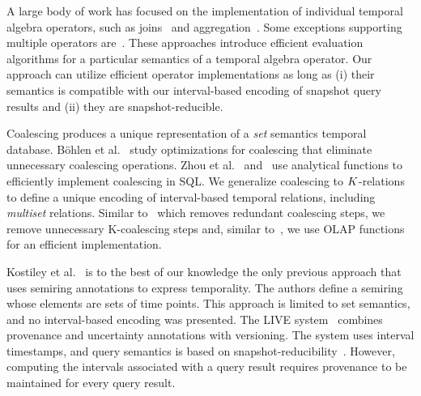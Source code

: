 %
A large body of work has focused on the implementation of individual
temporal algebra operators, such as
joins~\cite{DBLP:conf/sigmod/DignosBG14,DBLP:conf/icde/PiatovHD16,DBLP:journals/pvldb/BourosM17}
and
aggregation~\cite{DBLP:conf/edbt/BohlenGJ06,DBLP:conf/sigmod/PilmanKKKP16,DBLP:conf/ssd/PiatovH17}. Some
exceptions supporting multiple operators
are~\cite{DBLP:conf/sigmod/KaufmannMVFKFM13, DignosBGJ16,
  CafagnaB17}. These approaches introduce efficient evaluation
algorithms for a particular semantics of a temporal algebra operator.
Our approach can utilize efficient operator implementations as long as
(i) their semantics is compatible with our interval-based encoding of
snapshot query results and (ii) they are snapshot-reducible.

%
Coalescing produces a unique representation of a \emph{set} semantics
temporal database.  B\"ohlen et al.~\cite{DBLP:conf/vldb/BohlenSS96}
study optimizations for coalescing %
that eliminate unnecessary coalescing operations. Zhou et
al.~\cite{ZhouWZ06} and~\cite{DBLP:conf/dexa/Al-KatebGC12} use analytical functions to efficiently
implement coalescing in SQL.
%
We generalize coalescing to $K$-relations %
to define a unique encoding of
interval-based temporal relations, including \emph{multiset} relations. Similar
to~\cite{DBLP:conf/vldb/BohlenSS96} which removes redundant coalescing steps, we remove unnecessary K-coalescing steps
and, similar to~\cite{ZhouWZ06}, we use OLAP functions for an efficient implementation.




%
Kostiley et al.~\cite{KB12} is to the best of our knowledge the only
previous approach that uses semiring annotations to express
temporality. The authors define a semiring whose elements are sets of
time points. This approach is limited to set semantics, and no
interval-based encoding was presented.  The LIVE
system~\cite{DT10} combines provenance and uncertainty annotations
with versioning. The system uses interval timestamps, and query
semantics is based on snapshot-reducibility~\cite[Def.\
2]{DT10}. However, computing the intervals associated with a query
result requires provenance %
to be maintained for every query result.


